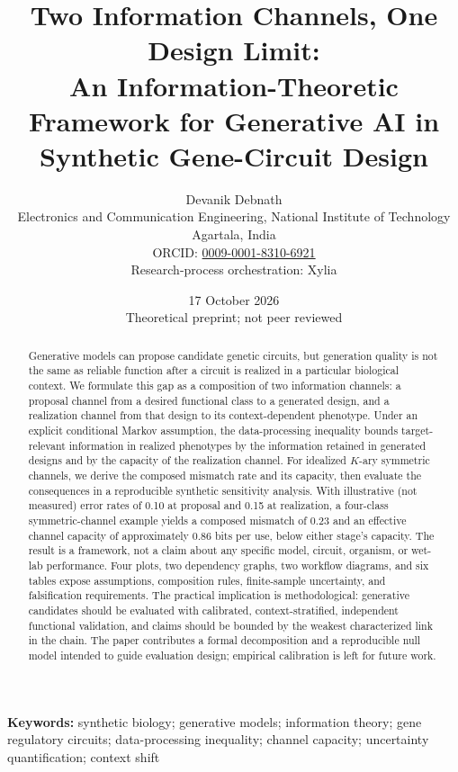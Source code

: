 \documentclass[11pt]{article}
\title{\textbf{Two Information Channels, One Design Limit:}\\[0.25em]\large An Information-Theoretic Framework for Generative AI in Synthetic Gene-Circuit Design}
\author{Devanik Debnath\\
\small Electronics and Communication Engineering, National Institute of Technology Agartala, India\\
\small ORCID: \href{https://orcid.org/0009-0001-8310-6921}{0009-0001-8310-6921}\\[0.4em]
\small Research-process orchestration: Xylia}
\date{17 October 2026\\[0.35em]\small Theoretical preprint; not peer reviewed}
\begin{document}
\maketitle
\begin{abstract}
Generative models can propose candidate genetic circuits, but generation quality is not the same as reliable function after a circuit is realized in a particular biological context. We formulate this gap as a composition of two information channels: a proposal channel from a desired functional class to a generated design, and a realization channel from that design to its context-dependent phenotype. Under an explicit conditional Markov assumption, the data-processing inequality bounds target-relevant information in realized phenotypes by the information retained in generated designs and by the capacity of the realization channel. For idealized $K$-ary symmetric channels, we derive the composed mismatch rate and its capacity, then evaluate the consequences in a reproducible synthetic sensitivity analysis. With illustrative (not measured) error rates of 0.10 at proposal and 0.15 at realization, a four-class symmetric-channel example yields a composed mismatch of 0.23 and an effective channel capacity of approximately 0.86 bits per use, below either stage's capacity. The result is a framework, not a claim about any specific model, circuit, organism, or wet-lab performance. Four plots, two dependency graphs, two workflow diagrams, and six tables expose assumptions, composition rules, finite-sample uncertainty, and falsification requirements. The practical implication is methodological: generative candidates should be evaluated with calibrated, context-stratified, independent functional validation, and claims should be bounded by the weakest characterized link in the chain. The paper contributes a formal decomposition and a reproducible null model intended to guide evaluation design; empirical calibration is left for future work.
\end{abstract}

\noindent\textbf{Keywords:} synthetic biology; generative models; information theory; gene regulatory circuits; data-processing inequality; channel capacity; uncertainty quantification; context shift
\end{document}
